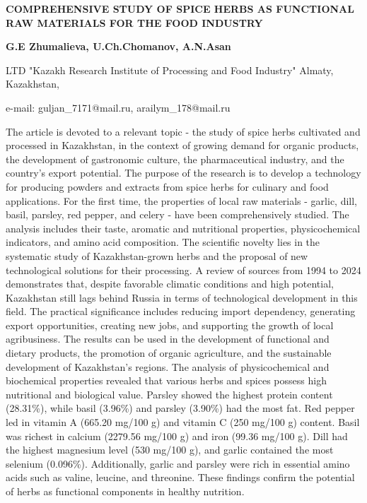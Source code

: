 \begin{articleheader}
{\bfseries COMPREHENSIVE STUDY OF SPICE HERBS AS FUNCTIONAL RAW MATERIALS
FOR THE FOOD INDUSTRY}

{\bfseries
G.E Zhumalieva\textsuperscript{\envelope },
U.Ch.Chomanov,
A.N.Asan\textsuperscript{\envelope }
}
\end{articleheader}

\begin{affiliation}
LTD "Kazakh Research Institute of Processing and Food Industry" Almaty, Kazakhstan,

e-mail: guljan\_7171@mail.ru, arailym\_178@mail.ru
\end{affiliation}

The article is devoted to a relevant topic - the study of spice herbs
cultivated and processed in Kazakhstan, in the context of growing demand
for organic products, the development of gastronomic culture, the
pharmaceutical industry, and the country's export potential. The purpose
of the research is to develop a technology for producing powders and
extracts from spice herbs for culinary and food applications. For the
first time, the properties of local raw materials - garlic, dill, basil,
parsley, red pepper, and celery - have been comprehensively studied. The
analysis includes their taste, aromatic and nutritional properties,
physicochemical indicators, and amino acid composition. The scientific
novelty lies in the systematic study of Kazakhstan-grown herbs and the
proposal of new technological solutions for their processing. A review
of sources from 1994 to 2024 demonstrates that, despite favorable
climatic conditions and high potential, Kazakhstan still lags behind
Russia in terms of technological development in this field. The
practical significance includes reducing import dependency, generating
export opportunities, creating new jobs, and supporting the growth of
local agribusiness. The results can be used in the development of
functional and dietary products, the promotion of organic agriculture,
and the sustainable development of Kazakhstan's regions. The analysis of
physicochemical and biochemical properties revealed that various herbs
and spices possess high nutritional and biological value. Parsley showed
the highest protein content (28.31\%), while basil (3.96\%) and parsley
(3.90\%) had the most fat. Red pepper led in vitamin A (665.20 mg/100 g)
and vitamin C (250 mg/100 g) content. Basil was richest in calcium
(2279.56 mg/100 g) and iron (99.36 mg/100 g). Dill had the highest
magnesium level (530 mg/100 g), and garlic contained the most selenium
(0.096\%). Additionally, garlic and parsley were rich in essential amino
acids such as valine, leucine, and threonine. These findings confirm the
potential of herbs as functional components in healthy nutrition.

